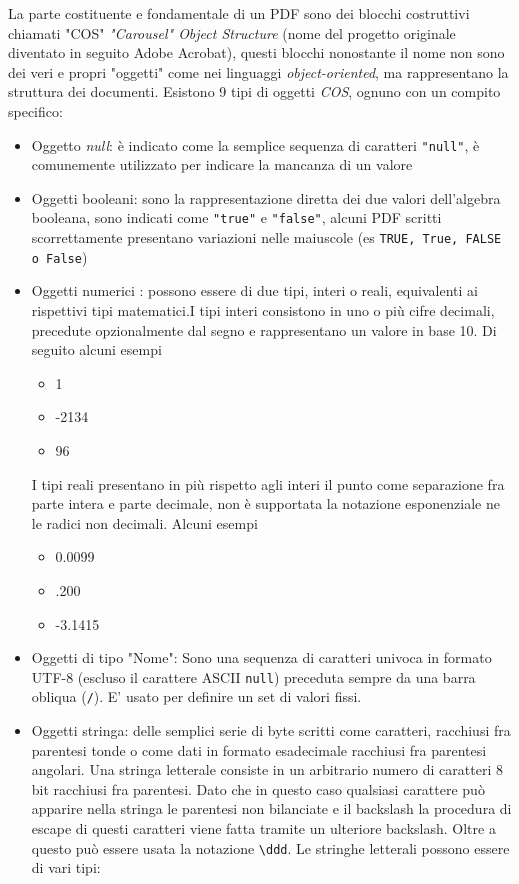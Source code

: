 La parte costituente e fondamentale di un PDF sono dei blocchi costruttivi chiamati "COS" \textit{"Carousel" Object Structure} (nome del progetto originale diventato in seguito Adobe Acrobat), questi blocchi nonostante il nome non sono dei veri e propri "oggetti" come nei linguaggi \textit{object-oriented}, ma rappresentano la struttura dei documenti.
Esistono 9 tipi di oggetti \textit{COS}, ognuno con un compito specifico:
\begin{itemize}
	\item Oggetto \textit{null}: è indicato come la semplice sequenza di caratteri \texttt{"null"}, è comunemente utilizzato per indicare la mancanza di un valore
	\item Oggetti booleani: sono la rappresentazione diretta dei due valori dell'algebra booleana, sono indicati come \texttt{"true"} e \texttt{"false"}, alcuni PDF scritti scorrettamente presentano variazioni nelle maiuscole (es \texttt{TRUE, True, FALSE o False})
	\item Oggetti numerici : possono essere di due tipi, interi o reali, equivalenti ai rispettivi tipi matematici.\newline I tipi interi consistono in uno o più cifre decimali, precedute opzionalmente dal segno e rappresentano un valore in base 10. Di seguito alcuni esempi
	 \begin{itemize} 
	 	\item 1 
	 	\item -2134
	 	\item 96
	 \end{itemize}
	 I tipi reali presentano in più rispetto agli interi il punto come separazione fra parte intera e parte decimale, non è supportata la notazione esponenziale ne le radici non decimali. Alcuni esempi
	 \begin{itemize}
	 \item 0.0099
	 \item .200
	 \item -3.1415
	 \end{itemize}
	 \item Oggetti di tipo "Nome": Sono una sequenza di caratteri univoca in formato UTF-8 (escluso il carattere ASCII \texttt{null}) preceduta sempre da una barra obliqua (\texttt{/}). E' usato per definire un set di valori fissi.
	 \item Oggetti stringa: delle semplici serie di byte scritti come caratteri, racchiusi fra parentesi tonde o come dati in formato esadecimale racchiusi fra parentesi angolari. Una stringa letterale consiste in un arbitrario numero di caratteri 8 bit racchiusi fra parentesi. Dato che in questo caso qualsiasi carattere può apparire nella stringa le parentesi non bilanciate e il backslash la procedura di escape di questi caratteri viene fatta tramite un ulteriore backslash. Oltre a questo può essere usata la notazione \texttt{\textbackslash ddd}. Le stringhe letterali possono essere di vari tipi:

\end{itemize}
